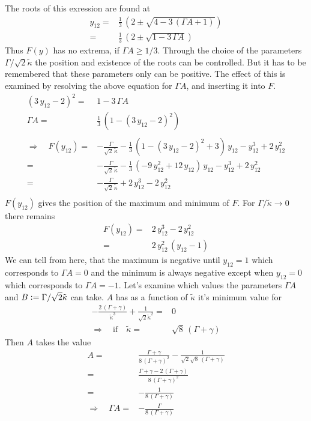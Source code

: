 \documentclass{article}
\begin{document}
The roots of this exression are found at
\begin{align*}
    y_{12}=&\frac{1}{3}\,\left(  2\pm \sqrt{4-3\,(\Gamma A+1)}  \right)\\
    =&\frac{1}{3}\,\left(  2\pm \sqrt{1-3\,\Gamma A}  \right)
\end{align*}
Thus $F(y)$ has no extrema, if $\Gamma A\geq1/3$. Through the choice of the parameters $\Gamma/\sqrt{2}\tilde{\kappa}$ the position and existence of the roots can be controlled. But it has to be remembered that these parameters only can be positive. The effect of this is examined by resolving the above equation for $\Gamma A$, and inserting it into $F$.
\begin{align*}
    (3\,y_{12}-2)^2=&1-3\,\Gamma A\\
    \Gamma A=& \frac{1}{3}\,\left(  1-(3\,y_{12}-2)^2 \right)\\\\
    \Rightarrow\quad F(y_{12})=&-\frac{\Gamma}{\sqrt{2}\,\tilde{\kappa}}-\frac{1}{3}\,\left(  1-(3\,y_{12}-2)^2 +3\right)\,y_{12}-y_{12}^3+2\,y_{12}^2\\
    =&-\frac{\Gamma}{\sqrt{2}\,\tilde{\kappa}}-\frac{1}{3}\,\left( - 9\,y_{12}^2+12\,y_{12}\right)\,y_{12}-y_{12}^3+2\,y_{12}^2\\
    =&-\frac{\Gamma}{\sqrt{2}\,\tilde{\kappa}}+2\,y_{12}^3-2\,y_{12}^2\\
\end{align*}
$F(y_{12})$ gives the position of the maximum and minimum of $F$. For $\Gamma/\tilde{\kappa}\rightarrow0$ there remains
\begin{align*}
    F(y_{12})=&2\,y_{12}^3-2\,y_{12}^2\\
    =&2\,y_{12}^2\,(y_{12}-1)
\end{align*}
We can tell from here, that the maximum is negative until $y_{12}=1$ which corresponds to $\Gamma A =0$ and the minimum is always negative except when $y_{12}=0$ which corresponds to $\Gamma A=-1$. Let's examine which values the parameters $\Gamma A$ and $B\vcentcolon=\Gamma/\sqrt{2}\tilde{\kappa}$ can take. $A$ has as a function of $\tilde{\kappa}$ it's minimum value for
\begin{align*}
    -\frac{2\,(\Gamma+\gamma)}{\tilde{\kappa}^3}+\frac{1}{\sqrt{2}\tilde{\kappa}^2}=&0\\
    \Rightarrow\quad\text{if}\quad \tilde{\kappa}=&\sqrt{8}\,(\Gamma+\gamma)
\end{align*}
Then $A$ takes the value
\begin{align*}
    A=&\frac{\Gamma+\gamma}{8\,(\Gamma+\gamma)^2}-\frac{1}{\sqrt{2}\sqrt{8}\,(\Gamma+\gamma)}\\
    =&\frac{\Gamma+\gamma-2\,(\Gamma+\gamma)}{8\,(\Gamma+\gamma)^2}\\
    =&-\frac{1}{8\,(\Gamma+\gamma)}\\
    \Rightarrow\quad \Gamma A=&-\frac{\Gamma}{8\,(\Gamma+\gamma)}
\end{align*}
\end{document}
